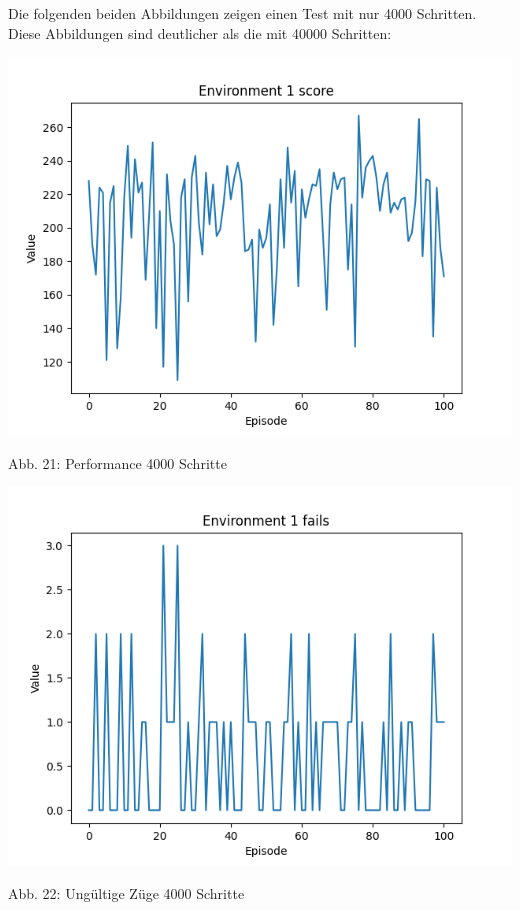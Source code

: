 \begin{minipage}{\linewidth}
	Die folgenden beiden Abbildungen zeigen einen Test mit nur 4000 Schritten. Diese Abbildungen sind deutlicher als die mit 40000 Schritten:
	
	\vspace{0.5cm}
	\includegraphics[width=1\textwidth]{Bilder/final4000steps}
	
	Abb. 21: Performance 4000 Schritte\\
	
\end{minipage}

\begin{minipage}{\linewidth}
	
	\vspace{0.5cm}
	\includegraphics[width=1\textwidth]{Bilder/final4000stepsf}
	
	Abb. 22: Ungültige Züge 4000 Schritte\\
	
\end{minipage}
